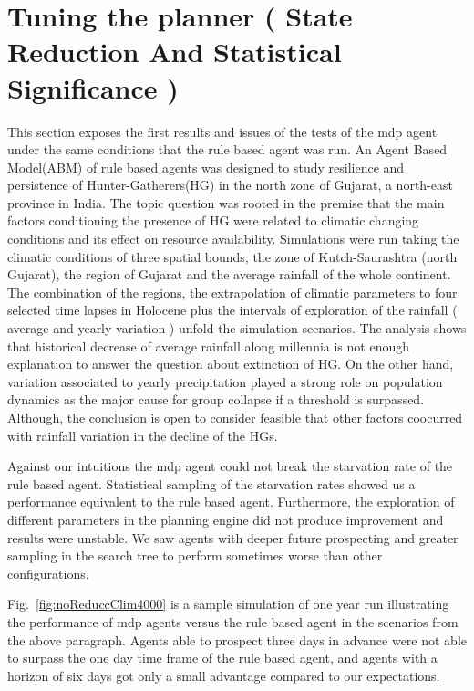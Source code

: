 \documentclass[11pt,oneside,a4paper,openright]{report}
\begin{document}
\section{Tuning the planner ( State Reduction And Statistical Significance )}
\label{sec:expStateReduction}

This section exposes the first results and issues of the tests of the mdp agent under the same conditions 
that the rule based agent was run\cite{JARM2014}. An Agent Based Model(ABM) of rule based agents was designed to study 
resilience and persistence of Hunter-Gatherers(HG) in the north zone of Gujarat, a north-east province in India. 
The topic question was rooted in the premise that the main factors conditioning the presence of HG were 
related to climatic changing conditions and its effect on resource availability. 
Simulations were run taking the climatic conditions of three spatial bounds, the zone of Kutch-Saurashtra 
(north Gujarat), the region of Gujarat and the average rainfall of the whole continent. The combination of
the regions, the extrapolation of climatic parameters to four selected time lapses in Holocene plus the 
intervals of exploration of the rainfall ( average and yearly variation ) unfold the simulation scenarios.
The analysis shows that historical decrease of average rainfall along millennia is not enough explanation 
to answer the question about extinction of HG. On the other hand, variation associated to yearly precipitation
played a strong role on population dynamics as the major cause for group collapse if a threshold is 
surpassed. Although, the conclusion is open to consider feasible that other factors coocurred with rainfall 
variation in the decline of the HGs.

Against our intuitions the mdp agent could not break the starvation rate of the rule based agent. Statistical 
sampling of the starvation rates showed us a performance equivalent to the rule based agent. Furthermore, 
the exploration of different parameters in the planning engine did not produce improvement and results were unstable. 
We saw agents with deeper future prospecting and greater sampling in the search tree to perform sometimes 
worse than other configurations.


Fig.~\ref{fig:noReduccClim4000} is a sample simulation of one year run illustrating the performance of mdp 
agents versus the rule based agent in the scenarios from the above paragraph. Agents able to prospect three 
days in advance were not able to surpass the one day time frame of the rule based agent, and agents with a 
horizon of six days got only a small advantage compared to our expectations.
\end{document}
